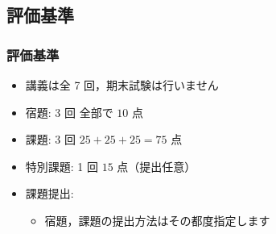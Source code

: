 \subsection{評価基準}
\begin{frame}
\frametitle{評価基準}
  \begin{itemize}
\item 講義は全 7 回，期末試験は行いません
\item 宿題: 3 回 全部で \(10\) 点
\item 課題: 3 回 \(25+25+25=75\) 点
\item 特別課題: 1 回 \(15\) 点（提出任意）
\item 課題提出: 
    \begin{itemize}
\item 宿題，課題の提出方法はその都度指定します
    \end{itemize}
  \end{itemize}
\end{frame}
%
%
